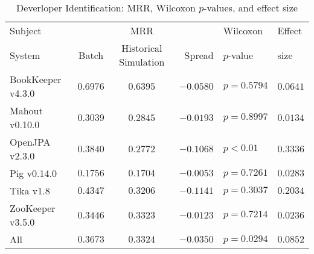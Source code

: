 \begin{table}[t]
\centering
\caption{Deverloper Identification: MRR, Wilcoxon $p$-values, and effect size}
\begin{tabular}{l|ccr|ll}
\toprule
Subject & & MRR & & Wilcoxon & Effect \\
System  &  Batch & Historical Simulation & Spread & $p$-value & size \\
\midrule
BookKeeper v4.3.0 & $\bm{0.6976}$ & $0.6395$ & $-0.0580$ & $p = 0.5794$ & $0.0641$ \\
Mahout v0.10.0 & $\bm{0.3039}$ & $0.2845$ & $-0.0193$ & $p = 0.8997$ & $0.0134$ \\
OpenJPA v2.3.0 & $\bm{0.3840}$ & $0.2772$ & $-0.1068$ & $p < 0.01$ & $0.3336$ \\
Pig v0.14.0 & $\bm{0.1756}$ & $0.1704$ & $-0.0053$ & $p = 0.7261$ & $0.0283$ \\
Tika v1.8 & $\bm{0.4347}$ & $0.3206$ & $-0.1141$ & $p = 0.3037$ & $0.2034$ \\
ZooKeeper v3.5.0 & $\bm{0.3446}$ & $0.3323$ & $-0.0123$ & $p = 0.7214$ & $0.0236$ \\
\midrule
All & $\bm{0.3673}$ & $0.3324$ & $-0.0350$ & $p = 0.0294$ & $0.0852$ \\
\bottomrule
\end{tabular}
\label{table:triage_rq2}
\end{table}
